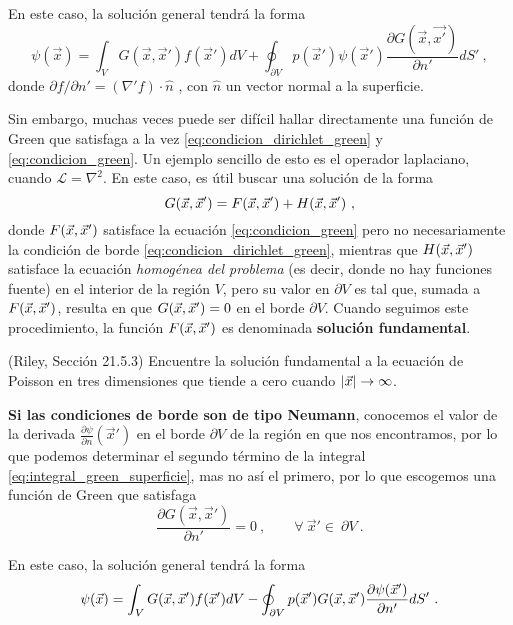 En este caso, la solución general tendrá la forma
\begin{equation}\label{eq:solucion_dirichlet}
    \psi(\vec{x}) = \int_V G(\vec{x}, \vec{x}') f(\vec{x}') dV + \oint_{\partial V} p(\vec{x}') \psi(\vec{x}') \frac{\partial G(\vec{x}, \vec{x'})}{\partial n'} dS' \ ,
\end{equation}
donde $\partial f/\partial n' = (\nabla' f) \cdot \hat{n}$ , con 
$\hat{n}$ un vector normal a la superficie.

Sin embargo, muchas veces puede ser difícil hallar directamente una función de Green que satisfaga a la vez \eqref{eq:condicion_dirichlet_green} y \eqref{eq:condicion_green}. Un ejemplo sencillo de esto es el operador laplaciano, cuando $\mathcal{L} = \nabla^2$. En este caso, es útil buscar una solución de la forma
\begin{equation}\label{eq:green_fundamental}
    G(\vec{x}, \vec{x}') = F(\vec{x}, \vec{x}') + H(\vec{x}, \vec{x}') \ ,
\end{equation}
donde $F(\vec{x}, \vec{x}')$ satisface la ecuación \eqref{eq:condicion_green} pero no necesariamente la condición de borde \eqref{eq:condicion_dirichlet_green}, mientras que $H(\vec{x}, \vec{x}')$ satisface la ecuación \emph{homogénea del problema} (es decir, donde no hay funciones fuente) en el interior de la región $V$, pero su valor en $\partial V$ es tal que, sumada a $F(\vec{x}, \vec{x}')$, resulta en que $G(\vec{x},\vec{x}') = 0$ en el borde $\partial V$. Cuando seguimos este procedimiento, la función $F(\vec{x},\vec{x}')$ es denominada \textbf{solución fundamental}.

\begin{ejemplo}
    (Riley, Sección 21.5.3) Encuentre la solución fundamental a la ecuación de Poisson en tres dimensiones que tiende a cero cuando $|\vec{x}| \to \infty$.
\end{ejemplo}


\textbf{Si las condiciones de borde son de tipo Neumann}, conocemos el valor de la derivada $\frac{\partial \psi}{\partial n}(\vec{x}')$ en el borde $\partial V$ de la región en que nos encontramos, por lo que podemos determinar el segundo término de la integral \eqref{eq:integral_green_superficie}, mas no así el primero, por lo que escogemos una función de Green que satisfaga
\begin{equation} \label{eq:condicion_neumann_green}
    \frac{\partial G(\vec{x}, \vec{x}')}{\partial n'} = 0 \ , \qquad \forall \ \vec{x}' \in \ \partial V \ .
\end{equation}

En este caso, la solución general tendrá la forma
\begin{equation}
    \psi(\vec{x}) = \int_V G(\vec{x}, \vec{x}') f(\vec{x}') dV - \oint_{\partial V} p(\vec{x} ') G(\vec{x}, \vec{x}') \frac{\partial \psi(\vec{x}')}{\partial n'} dS' \ .
\end{equation}

